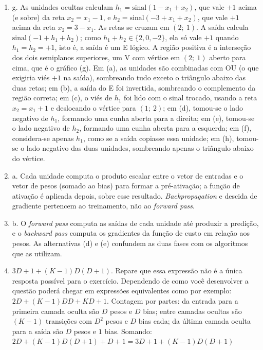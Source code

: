 \documentclass{dlproblemset}
\begin{document}
\begin{enumerate}[1)]
    \item g. As unidades ocultas calculam $h_1 = \mathrm{sinal}(1 - x_1 + x_2)$, que vale $+1$ acima (e sobre) da reta $x_2 = x_1 - 1$, e $h_2 = \mathrm{sinal}(-3 + x_1 + x_2)$, que vale $+1$ acima da reta $x_2 = 3 - x_1$. As retas se cruzam em $(2;\ 1)$. A saída calcula $\mathrm{sinal}(-1 + h_1 + h_2)$; como $h_1 + h_2 \in \{2, 0, -2\}$, ela só vale $+1$ quando $h_1 = h_2 = +1$, isto é, a saída é um E lógico. A região positiva é a interseção dos dois semiplanos superiores, um V com vértice em $(2;\ 1)$ aberto para cima, que é o gráfico (g). Em (a), as unidades são combinadas com OU (o que exigiria viés $+1$ na saída), sombreando tudo exceto o triângulo abaixo das duas retas; em (b), a saída do E foi invertida, sombreando o complemento da região correta; em (c), o viés de $h_1$ foi lido com o sinal trocado, usando a reta $x_2 = x_1 + 1$ e deslocando o vértice para $(1;\ 2)$; em (d), tomou-se o lado negativo de $h_1$, formando uma cunha aberta para a direita; em (e), tomou-se o lado negativo de $h_2$, formando uma cunha aberta para a esquerda; em (f), considera-se apenas $h_1$, como se a saída copiasse essa unidade; em (h), tomou-se o lado negativo das duas unidades, sombreando apenas o triângulo abaixo do vértice.

    \item a. Cada unidade computa o produto escalar entre o vetor de entradas e o vetor de pesos (somado ao bias) para formar a pré-ativação; a função de ativação é aplicada depois, sobre esse resultado. \textit{Backpropagation} e descida de gradiente pertencem ao treinamento, não ao \textit{forward pass}.

    \item b. O \textit{forward pass} computa as saídas de cada unidade até produzir a predição, e o \textit{backward pass} computa os gradientes da função de custo em relação aos pesos. As alternativas (d) e (e) confundem as duas fases com os algoritmos que as utilizam.

    \item $3D + 1 + (K - 1)D(D + 1)$. Repare que essa expressão não é a única resposta possível para o exercício. Dependendo de como você desenvolver a questão poderá chegar em expressões equivalentes como por exemplo: $2D + (K - 1)DD + KD + 1$. Contagem por partes: da entrada para a primeira camada oculta são $D$ pesos e $D$ bias; entre camadas ocultas são $(K-1)$ transições com $D^2$ pesos e $D$ bias cada; da última camada oculta para a saída são $D$ pesos e $1$ bias. Somando: $2D + (K-1)D(D+1) + D + 1 = 3D + 1 + (K-1)D(D+1)$


\end{enumerate}
\end{document}
